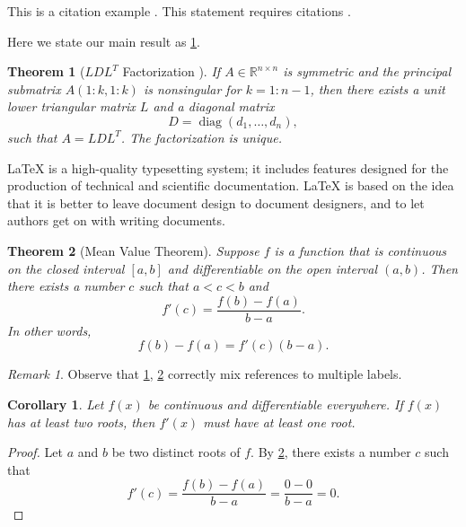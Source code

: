 \documentclass{article}
\theoremstyle{plain}
\newtheorem{theorem}{Theorem}[section]
\newtheorem{corollary}{Corollary}[section]
\theoremstyle{definition}
\theoremstyle{remark}
\newtheorem{remark}{Remark}[section]
\numberwithin{equation}{section}
\numberwithin{figure}{section}
\numberwithin{table}{section}
\begin{document}
This is a citation example \cite{Adams2003,TreWei2014}.
This statement requires citations \cite{Shen1994,Tadmor2012,TreWei2014}.

Here we state our main result as \ref{thm:bigthm}.

\begin{theorem}[$LDL^T$ Factorization \cite{GoVa2013}]\label{thm:bigthm}
  If $A \in \mathbb{R}^{n \times n}$ is symmetric and the principal submatrix $A(1:k,1:k)$ is nonsingular for $k=1:n-1$, then there
  exists a unit lower triangular matrix $L$ and a diagonal matrix
  \begin{equation*}
    D = \operatorname{diag}(d_1,\dots,d_n),  %
  \end{equation*}
  such that $A=LDL^T$. The factorization is unique.
\end{theorem}

LaTeX is a high-quality typesetting system; it includes features designed for the production of technical and scientific documentation.
LaTeX is based on the idea that it is better to leave document design to document designers, and to let authors get on with writing documents.

\begin{theorem}[Mean Value Theorem]\label{thm:mvt}
  Suppose $f$ is a function that is continuous on the closed interval $[a,b]$ and differentiable on the open interval $(a,b)$.
  Then there exists a number $c$ such that $a < c < b$ and
  \begin{equation*}
    f'(c) = \frac{f(b)-f(a)}{b-a}.
  \end{equation*}
  In other words,
  \begin{equation*}
    f(b)-f(a) = f'(c)(b-a).
  \end{equation*}
\end{theorem}

\begin{remark}
Observe that \ref{thm:bigthm}, \ref{thm:mvt} correctly mix references to multiple labels.
\end{remark}


\begin{corollary}\label{cor:a}
  Let $f(x)$ be continuous and differentiable everywhere.
  If $f(x)$ has at least two roots, then $f'(x)$ must have at least one root.
\end{corollary}
\begin{proof}
  Let $a$ and $b$ be two distinct roots of $f$.
  By \ref{thm:mvt}, there exists a number $c$ such that
  \begin{equation*}
    f'(c) = \frac{f(b)-f(a)}{b-a} = \frac{0-0}{b-a} = 0.
  \end{equation*}
\end{proof}
\end{document}

